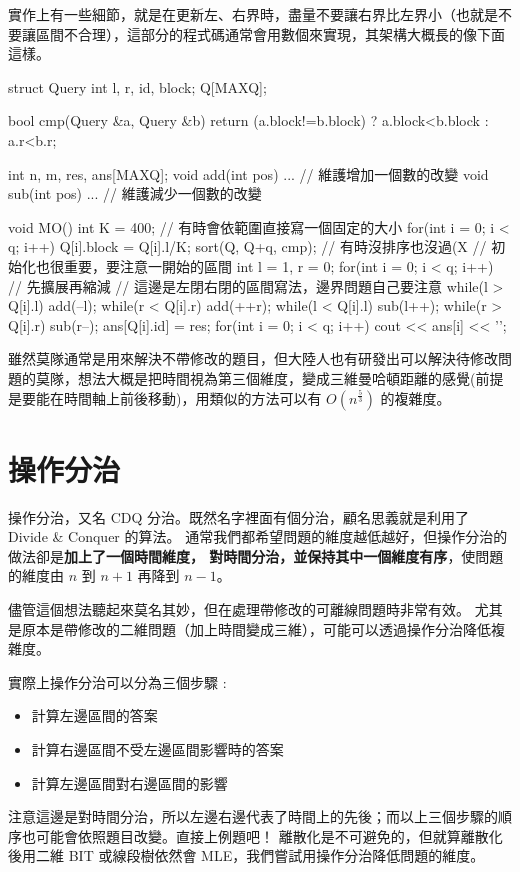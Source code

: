 實作上有一些細節，就是在更新左、右界時，盡量不要讓右界比左界小（也就是不要讓區間不合理），這部分的程式碼通常會用數個來實現，其架構大概長的像下面這樣。

\begin{C++}
struct Query{
	int l, r, id, block;
} Q[MAXQ];

bool cmp(Query &a, Query &b){
	return (a.block!=b.block) ? a.block<b.block : a.r<b.r;
}

int n, m, res, ans[MAXQ];
void add(int pos){ ... } // 維護增加一個數的改變
void sub(int pos){ ... } // 維護減少一個數的改變

void MO(){
	int K = 400; // 有時會依範圍直接寫一個固定的大小
	for(int i = 0; i < q; i++) Q[i].block = Q[i].l/K;
	sort(Q, Q+q, cmp); // 有時沒排序也沒過(X
	// 初始化也很重要，要注意一開始的區間
	int l = 1, r = 0;
	for(int i = 0; i < q; i++){
		// 先擴展再縮減
		// 這邊是左閉右閉的區間寫法，邊界問題自己要注意
		while(l > Q[i].l) add(--l);
		while(r < Q[i].r) add(++r);
		while(l < Q[i].l) sub(l++);
		while(r > Q[i].r) sub(r--);
		ans[Q[i].id] = res;
	}
	for(int i = 0; i < q; i++) cout << ans[i] << '\n';
}
\end{C++}

雖然莫隊通常是用來解決不帶修改的題目，但大陸人也有研發出可以解決待修改問題的莫隊，想法大概是把時間視為第三個維度，變成三維曼哈頓距離的感覺(前提是要能在時間軸上前後移動)，用類似的方法可以有 $O(n^\frac{5}{3})$ 的複雜度。
\section{操作分治}
操作分治，又名 CDQ 分治。既然名字裡面有個分治，顧名思義就是利用了 Divide \& Conquer 的算法。
通常我們都希望問題的維度越低越好，但操作分治的做法卻是\textbf{加上了一個時間維度，
對時間分治，並保持其中一個維度有序}，使問題的維度由 $n$ 到 $n+1$ 再降到 $n-1$。

儘管這個想法聽起來莫名其妙，但在處理帶修改的可離線問題時非常有效。
尤其是原本是帶修改的二維問題（加上時間變成三維），可能可以透過操作分治降低複雜度。

實際上操作分治可以分為三個步驟 :
\begin{itemize}
\item 計算左邊區間的答案
\item 計算右邊區間不受左邊區間影響時的答案
\item 計算左邊區間對右邊區間的影響
\end{itemize}
注意這邊是對時間分治，所以左邊右邊代表了時間上的先後；而以上三個步驟的順序也可能會依照題目改變。直接上例題吧！
離散化是不可避免的，但就算離散化後用二維 BIT 或線段樹依然會 MLE，我們嘗試用操作分治降低問題的維度。

